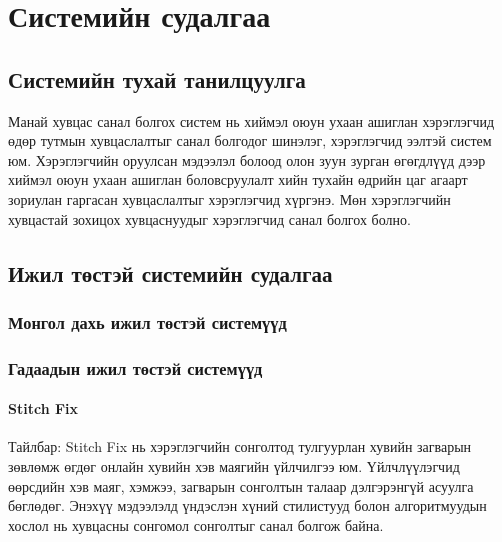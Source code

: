 \chapter{Системийн судалгаа}
\label{chapter1}
\section{Системийн тухай танилцуулга}

\par Манай хувцас санал болгох систем нь хиймэл оюун ухаан ашиглан  хэрэглэгчид өдөр тутмын хувцаслалтыг санал болгодог шинэлэг, хэрэглэгчид ээлтэй систем юм. Хэрэглэгчийн оруулсан мэдээлэл болоод олон зуун зурган өгөгдлүүд дээр хиймэл оюун ухаан ашиглан боловсруулалт хийн тухайн өдрийн цаг агаарт зориулан гаргасан хувцаслалтыг хэрэглэгчид хүргэнэ. Мөн хэрэглэгчийн хувцастай зохицох хувцаснуудыг хэрэглэгчид санал болгох болно.

\section{Ижил төстэй системийн судалгаа}
\subsection{Монгол дахь ижил төстэй системүүд}
\subsection{Гадаадын ижил төстэй системүүд}
\subsubsection*{ Stitch Fix}
\par Тайлбар: Stitch Fix нь хэрэглэгчийн сонголтод тулгуурлан хувийн загварын зөвлөмж өгдөг онлайн хувийн хэв маягийн үйлчилгээ юм. Үйлчлүүлэгчид өөрсдийн хэв маяг, хэмжээ, загварын сонголтын талаар дэлгэрэнгүй асуулга бөглөдөг. Энэхүү мэдээлэлд үндэслэн хүний стилистууд болон алгоритмуудын хослол нь хувцасны сонгомол сонголтыг санал болгож байна.

